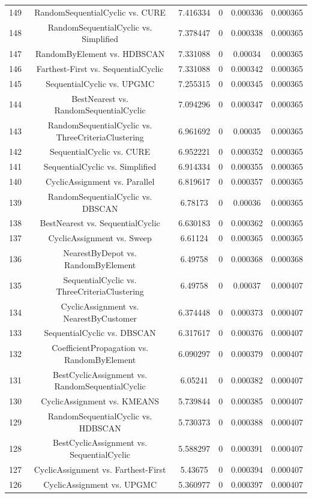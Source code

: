 \documentclass[a4paper,10pt]{article}
\begin{document}
\begin{landscape}
\begin{table}[!htp]
\begin{tabular}{cccccc}
149&RandomSequentialCyclic vs. CURE&7.416334&0&0.000336&0.000365\\
148&RandomSequentialCyclic vs. Simplified&7.378447&0&0.000338&0.000365\\
147&RandomByElement vs. HDBSCAN&7.331088&0&0.00034&0.000365\\
146&Farthest-First vs. SequentialCyclic&7.331088&0&0.000342&0.000365\\
145&SequentialCyclic vs. UPGMC&7.255315&0&0.000345&0.000365\\
144&BestNearest vs. RandomSequentialCyclic&7.094296&0&0.000347&0.000365\\
143&RandomSequentialCyclic vs. ThreeCriteriaClustering&6.961692&0&0.00035&0.000365\\
142&SequentialCyclic vs. CURE&6.952221&0&0.000352&0.000365\\
141&SequentialCyclic vs. Simplified&6.914334&0&0.000355&0.000365\\
140&CyclicAssignment vs. Parallel&6.819617&0&0.000357&0.000365\\
139&RandomSequentialCyclic vs. DBSCAN&6.78173&0&0.00036&0.000365\\
138&BestNearest vs. SequentialCyclic&6.630183&0&0.000362&0.000365\\
137&CyclicAssignment vs. Sweep&6.61124&0&0.000365&0.000365\\
136&NearestByDepot vs. RandomByElement&6.49758&0&0.000368&0.000368\\
135&SequentialCyclic vs. ThreeCriteriaClustering&6.49758&0&0.00037&0.000407\\
134&CyclicAssignment vs. NearestByCustomer&6.374448&0&0.000373&0.000407\\
133&SequentialCyclic vs. DBSCAN&6.317617&0&0.000376&0.000407\\
132&CoefficientPropagation vs. RandomByElement&6.090297&0&0.000379&0.000407\\
131&BestCyclicAssignment vs. RandomSequentialCyclic&6.05241&0&0.000382&0.000407\\
130&CyclicAssignment vs. KMEANS&5.739844&0&0.000385&0.000407\\
129&RandomSequentialCyclic vs. HDBSCAN&5.730373&0&0.000388&0.000407\\
128&BestCyclicAssignment vs. SequentialCyclic&5.588297&0&0.000391&0.000407\\
127&CyclicAssignment vs. Farthest-First&5.43675&0&0.000394&0.000407\\
126&CyclicAssignment vs. UPGMC&5.360977&0&0.000397&0.000407\\

\end{tabular}
\end{table}
\end{landscape}
\end{document}
